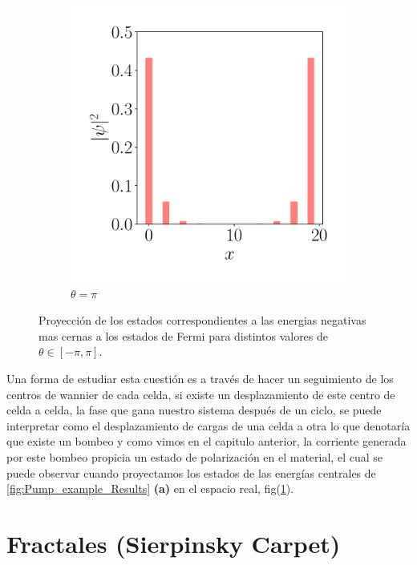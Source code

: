\begin{figure}[h!]
\begin{subfigure}[b!]{0.2 \textwidth}
    \end{subfigure}\hspace*{-0.9em}
    \begin{subfigure}[b!]{0.2 \textwidth}
        \caption*{$\theta=\pi$}
        \includegraphics[width=\textwidth]{Imagenes/Shh_images/proyection_4.pdf}
    \end{subfigure}
       \caption{Proyección de los estados correspondientes a las energias negativas mas cernas a los estados de Fermi para distintos valores de $\theta \in [-\pi, \pi]$. }
    \label{fig:pump_RM_proyection}
\end{figure}

Una forma de estudiar esta cuestión es a través de hacer un seguimiento de los centros de wannier de cada celda, si existe un desplazamiento de este centro de celda a celda, la fase que gana nuestro sistema después de un ciclo, se puede interpretar como el desplazamiento de cargas de una celda a otra lo que denotaría que existe un bombeo y como vimos en el capitulo anterior, la corriente generada por este bombeo propicia un estado de polarización en el material, el cual se puede observar cuando proyectamos los estados de las energías centrales de \ref{fig:Pump_example_Results} \textbf{(a)} en el espacio real, fig(\ref{fig:pump_RM_proyection}).


\section{Fractales (Sierpinsky Carpet)}
\label{sc:Fractales}

